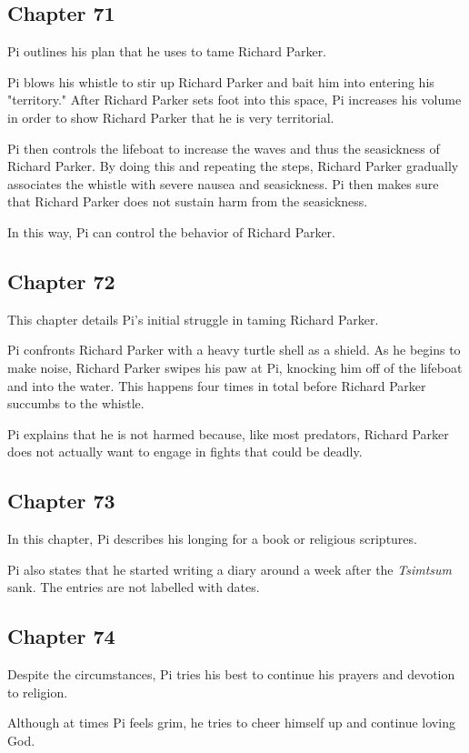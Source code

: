 \documentclass[11pt]{article}
\begin{document}
\subsection{Chapter 71}
\label{sec:orgcc00c81}
Pi outlines his plan that he uses to tame Richard Parker.

Pi blows his whistle to stir up Richard Parker and bait him into entering his "territory." After Richard Parker sets foot into this space, Pi increases his volume in order to show Richard Parker that he is very territorial.

Pi then controls the lifeboat to increase the waves and thus the seasickness of Richard Parker. By doing this and repeating the steps, Richard Parker gradually associates the whistle with severe nausea and seasickness. Pi then makes sure that Richard Parker does not sustain harm from the seasickness.

In this way, Pi can control the behavior of Richard Parker.
\subsection{Chapter 72}
\label{sec:org30060d5}
This chapter details Pi's initial struggle in taming Richard Parker.

Pi confronts Richard Parker with a heavy turtle shell as a shield. As he begins to make noise, Richard Parker swipes his paw at Pi, knocking him off of the lifeboat and into the water. This happens four times in total before Richard Parker succumbs to the whistle.

Pi explains that he is not harmed because, like most predators, Richard Parker does not actually want to engage in fights that could be deadly.
\subsection{Chapter 73}
\label{sec:org527a314}
In this chapter, Pi describes his longing for a book or religious scriptures.

Pi also states that he started writing a diary around a week after the \emph{Tsimtsum} sank. The entries are not labelled with dates.
\subsection{Chapter 74}
\label{sec:orgcf00722}
Despite the circumstances, Pi tries his best to continue his prayers and devotion to religion.

Although at times Pi feels grim, he tries to cheer himself up and continue loving God.
\end{document}
